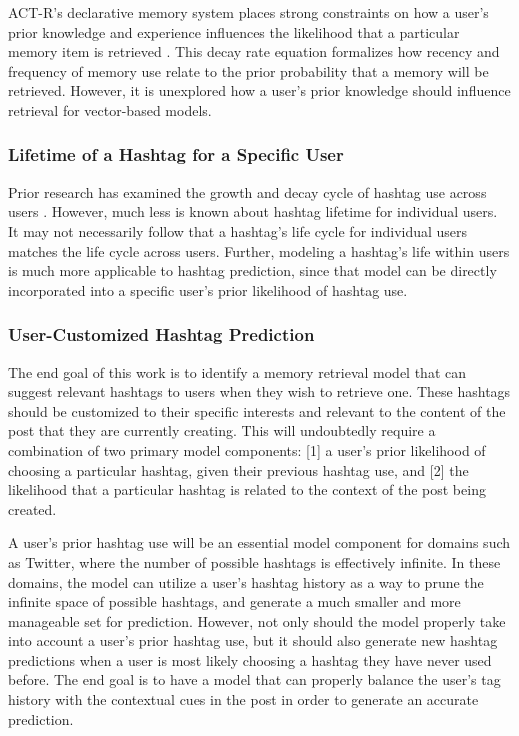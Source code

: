 \documentclass[man,floatsintext,donotrepeattitle]{apa6}
\begin{document}
ACT-R's declarative memory system places strong constraints on how a user's prior knowledge and experience influences the likelihood that a particular memory item is retrieved \parencite{Anderson2007}.
This decay rate equation formalizes how recency and frequency of memory use relate to the prior probability that a memory will be retrieved.
However, it is unexplored how a user's prior knowledge should influence retrieval for vector-based models.

\subsubsection{Lifetime of a Hashtag for a Specific User}

Prior research has examined the growth and decay cycle of hashtag use across users \parencite{Tsur2012}.
However, much less is known about hashtag lifetime for individual users.
It may not necessarily follow that a hashtag's life cycle for individual users matches the life cycle across users.
Further, modeling a hashtag's life within users is much more applicable to hashtag prediction, since that model can be directly incorporated into a specific user's prior likelihood of hashtag use.

\subsubsection{User-Customized Hashtag Prediction}

The end goal of this work is to identify a memory retrieval model that can suggest relevant hashtags to users when they wish to retrieve one.
These hashtags should be customized to their specific interests and relevant to the content of the post that they are currently creating.
This will undoubtedly require a combination of two primary model components:
[1] a user's prior likelihood of choosing a particular hashtag, given their previous hashtag use, and [2] the likelihood that a particular hashtag is related to the context of the post being created. 

A user's prior hashtag use will be an essential model component for domains such as Twitter, where the number of possible hashtags is effectively infinite.
In these domains, the model can utilize a user's hashtag history as a way to prune the infinite space of possible hashtags, and generate a much smaller and more manageable set for prediction.
However, not only should the model properly take into account a user's prior hashtag use, but it should also generate new hashtag predictions when a user is most likely choosing a hashtag they have never used before.
The end goal is to have a model that can properly balance the user's tag history with the contextual cues in the post in order to generate an accurate prediction.
\end{document}
